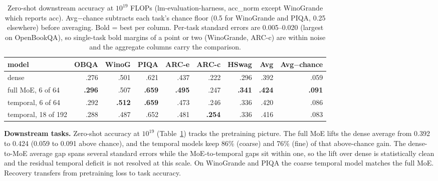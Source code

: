 \documentclass{article}
\begin{document}
\begin{table}[t]
  \centering\small
  \caption{Zero-shot downstream accuracy at $10^{19}$ FLOPs (lm-evaluation-harness, acc\_norm
  except WinoGrande which reports acc). Avg$-$chance subtracts each task's chance floor (0.5 for
  WinoGrande and PIQA, 0.25 elsewhere) before averaging. Bold = best per column. Per-task
  standard errors are 0.005--0.020 (largest on OpenBookQA), so single-task bold margins of a
  point or two (WinoGrande, ARC-c) are within noise and the aggregate columns carry the
  comparison.}
  \label{tab:lmeval}
  \vspace{4pt}
  \begin{tabular}{@{}lrrrrrrrr@{}}
    \toprule
    model & OBQA & WinoG & PIQA & ARC-e & ARC-c & HSwag & Avg & Avg$-$chance \\
    \midrule
    dense                 & .276 & .501 & .621 & .437 & .222 & .296 & .392 & .059 \\
    full MoE, 6 of 64     & \textbf{.296} & .507 & \textbf{.659} & \textbf{.495} & .247 & \textbf{.341} & \textbf{.424} & \textbf{.091} \\
    temporal, 6 of 64     & .292 & \textbf{.512} & \textbf{.659} & .473 & .246 & .336 & .420 & .086 \\
    temporal, 18 of 192   & .288 & .487 & .652 & .481 & \textbf{.254} & .336 & .416 & .083 \\
    \bottomrule
  \end{tabular}
\end{table}

\textbf{Downstream tasks.} Zero-shot accuracy at $10^{19}$ (Table~\ref{tab:lmeval}) tracks the
pretraining picture. The full MoE lifts the dense average from 0.392 to 0.424 (0.059 to 0.091
above chance), and the temporal models keep 86\% (coarse) and 76\% (fine) of that above-chance
gain. The dense-to-MoE average gap spans several standard errors while the MoE-to-temporal gaps
sit within one, so the lift over dense is statistically clean and the residual temporal deficit
is not resolved at this scale. On WinoGrande and PIQA the coarse temporal model matches the
full MoE. Recovery transfers
from pretraining loss to task accuracy.
\end{document}
